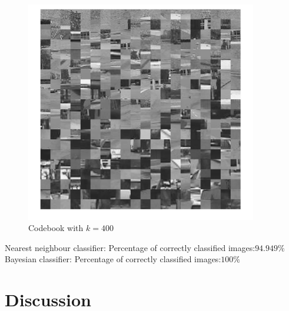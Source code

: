 \documentclass[12pt]{article}
\begin{document}
\vspace{5mm}
\begin{figure}[H]
	\centering
	\includegraphics[width=0.9\textwidth]{k400.jpg}
	\caption{Codebook with $k=400$}
	\label{fig1}
\end{figure}
\vspace{5mm}
Nearest neighbour classifier: 
\newline
Percentage of correctly classified images:$94.949\%$
\vspace{5mm}
\newline
Bayesian classifier: 
\newline
Percentage of correctly classified images:$100\%$

\section{Discussion}
\end{document}
